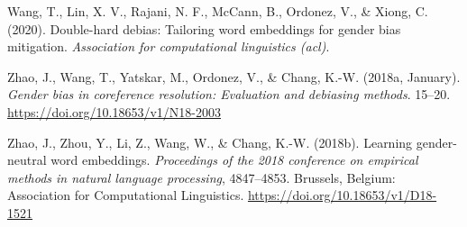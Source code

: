 \documentclass[
  english,
  man,floatsintext]{apa6}
\begin{document}
\leavevmode\hypertarget{ref-wang_2020}{}%
Wang, T., Lin, X. V., Rajani, N. F., McCann, B., Ordonez, V., \& Xiong, C. (2020). Double-hard debias: Tailoring word embeddings for gender bias mitigation. \emph{Association for computational linguistics (acl)}.

\leavevmode\hypertarget{ref-zhao_2018a}{}%
Zhao, J., Wang, T., Yatskar, M., Ordonez, V., \& Chang, K.-W. (2018a, January). \emph{Gender bias in coreference resolution: Evaluation and debiasing methods}. 15--20. \url{https://doi.org/10.18653/v1/N18-2003}

\leavevmode\hypertarget{ref-zhao_2018b}{}%
Zhao, J., Zhou, Y., Li, Z., Wang, W., \& Chang, K.-W. (2018b). Learning gender-neutral word embeddings. \emph{Proceedings of the 2018 conference on empirical methods in natural language processing}, 4847--4853. Brussels, Belgium: Association for Computational Linguistics. \url{https://doi.org/10.18653/v1/D18-1521}

\endgroup
\end{document}
